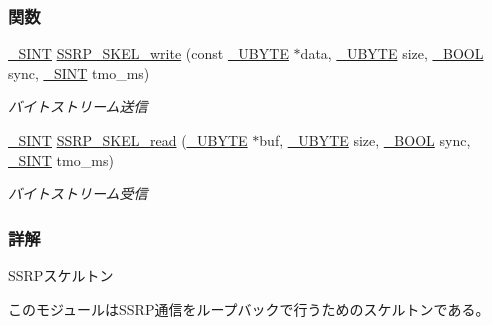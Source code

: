 \subsubsection*{関数}
\begin{DoxyCompactItemize}
\item 
\hyperlink{stddef_8h_aefd1068e35d26c0e7d7079ddf2579174_aefd1068e35d26c0e7d7079ddf2579174}{\+\_\+\+S\+I\+N\+T} \hyperlink{ssrp__skel_8h_ab2e28ef1ff83be3a847336df494d38ae_ab2e28ef1ff83be3a847336df494d38ae}{S\+S\+R\+P\+\_\+\+S\+K\+E\+L\+\_\+write} (const \hyperlink{stddef_8h_aac464b47452ce9406f88ef194e2becc1_aac464b47452ce9406f88ef194e2becc1}{\+\_\+\+U\+B\+Y\+T\+E} $\ast$data, \hyperlink{stddef_8h_aac464b47452ce9406f88ef194e2becc1_aac464b47452ce9406f88ef194e2becc1}{\+\_\+\+U\+B\+Y\+T\+E} size, \hyperlink{stddef_8h_afbf708854fe02af8475a9ba02f3196cb_afbf708854fe02af8475a9ba02f3196cb}{\+\_\+\+B\+O\+O\+L} sync, \hyperlink{stddef_8h_aefd1068e35d26c0e7d7079ddf2579174_aefd1068e35d26c0e7d7079ddf2579174}{\+\_\+\+S\+I\+N\+T} tmo\+\_\+ms)
\begin{DoxyCompactList}\small\item\em バイトストリーム送信 \end{DoxyCompactList}\item 
\hyperlink{stddef_8h_aefd1068e35d26c0e7d7079ddf2579174_aefd1068e35d26c0e7d7079ddf2579174}{\+\_\+\+S\+I\+N\+T} \hyperlink{ssrp__skel_8h_a102cdac7558ea62fdd9090cbdae677ac_a102cdac7558ea62fdd9090cbdae677ac}{S\+S\+R\+P\+\_\+\+S\+K\+E\+L\+\_\+read} (\hyperlink{stddef_8h_aac464b47452ce9406f88ef194e2becc1_aac464b47452ce9406f88ef194e2becc1}{\+\_\+\+U\+B\+Y\+T\+E} $\ast$buf, \hyperlink{stddef_8h_aac464b47452ce9406f88ef194e2becc1_aac464b47452ce9406f88ef194e2becc1}{\+\_\+\+U\+B\+Y\+T\+E} size, \hyperlink{stddef_8h_afbf708854fe02af8475a9ba02f3196cb_afbf708854fe02af8475a9ba02f3196cb}{\+\_\+\+B\+O\+O\+L} sync, \hyperlink{stddef_8h_aefd1068e35d26c0e7d7079ddf2579174_aefd1068e35d26c0e7d7079ddf2579174}{\+\_\+\+S\+I\+N\+T} tmo\+\_\+ms)
\begin{DoxyCompactList}\small\item\em バイトストリーム受信 \end{DoxyCompactList}\end{DoxyCompactItemize}


\subsubsection{詳解}
S\+S\+R\+Pスケルトン 

このモジュールは\+S\+S\+R\+P通信をループバックで行うためのスケルトンである。

